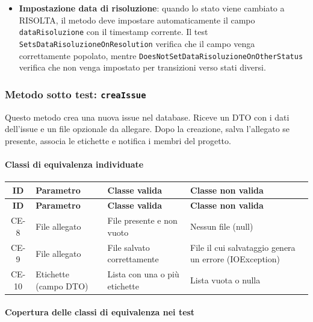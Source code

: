 \begin{itemize}
    \item \textbf{Impostazione data di risoluzione}: quando lo stato viene cambiato a RISOLTA, il metodo deve impostare automaticamente il campo \texttt{dataRisoluzione} con il timestamp corrente. Il test \texttt{SetsDataRisoluzioneOnResolution} verifica che il campo venga correttamente popolato, mentre \texttt{DoesNotSetDataRisoluzioneOnOtherStatus} verifica che non venga impostato per transizioni verso stati diversi.
\end{itemize}


\subsubsection{Metodo sotto test: \texttt{creaIssue}}

Questo metodo crea una nuova issue nel database.
Riceve un DTO con i dati dell'issue e un file opzionale da allegare.
Dopo la creazione, salva l'allegato se presente, associa le etichette e notifica i membri del progetto.

\paragraph{Classi di equivalenza individuate}

\begin{longtable}{|c|p{3.5cm}|p{5cm}|p{5cm}|}
\hline
\textbf{ID} & \textbf{Parametro} & \textbf{Classe valida} & \textbf{Classe non valida} \\
\hline
\endfirsthead
\hline
\textbf{ID} & \textbf{Parametro} & \textbf{Classe valida} & \textbf{Classe non valida} \\
\hline
\endhead
CE-8 &
File allegato &
File presente e non vuoto &
Nessun file (null) \\
\hline
CE-9 &
File allegato &
File salvato correttamente &
File il cui salvataggio genera un errore (IOException) \\
\hline
CE-10 &
Etichette (campo DTO) &
Lista con una o pi\`u etichette &
Lista vuota o nulla \\
\hline
\end{longtable}

\paragraph{Copertura delle classi di equivalenza nei test}

